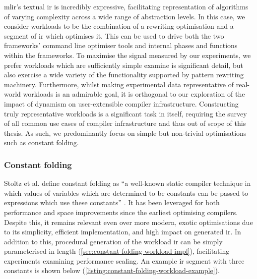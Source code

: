 \ac{mlir}'s textual \ac{ir} is incredibly expressive, facilitating representation of algorithms of varying complexity across a wide range of abstraction levels.
In this case, we consider workloads to be the combination of a rewriting optimisation and a segment of \ac{ir} which optimises it. This can be used to drive both the two frameworks' command line optimiser tools and internal phases and functions within the frameworks.
To maximise the signal measured by our experiments, we prefer workloads which are sufficiently simple examine is significant detail, but also exercise a wide variety of the functionality supported by %
pattern rewriting machinery.
Furthermore, whilst making experimental data representative of real-world workloads is an admirable goal, it is orthogonal to our exploration of the impact of dynamism on user-extensible compiler infrastructure.
Constructing truly representative workloads is a significant task in itself, requiring the survey of all common use cases of compiler infrastructure and thus out of scope of this thesis.
As such, we predominantly focus on simple but non-trivial optimisations such as constant folding.

\subsubsection{Constant folding}
\label{sssec:experimental-workload-constant-folding}

Stoltz et al. define constant folding as ``a well-known static compiler technique in which values of variables which are determined to be constants can be passed to expressions which use these constants'' \cite{stoltzConstantPropagationFresh1994}.
It has been leveraged for both performance and space improvements since the earliest optimising compilers. Despite this, it remains relevant even over more modern, exotic optimisations due to its simplicity, efficient implementation, and high impact on generated \ac{ir}.
In addition to this, procedural generation of the workload \ac{ir} can be simply parameterised in length (\autoref{sec:constant-folding-workload-impl}), facilitating experiments examining performance scaling.
An example \ac{ir} segment with three constants is shown below (\autoref{listing:constant-folding-workload-example}).

